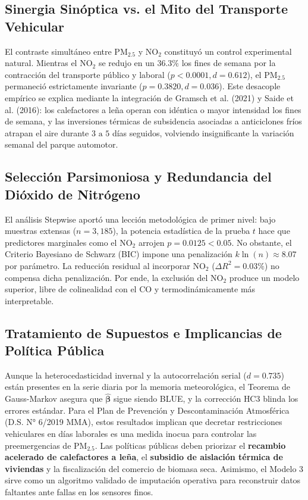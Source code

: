 \documentclass[10pt,twocolumn,a4paper]{article}
\begin{document}
\subsection{Sinergia Sinóptica vs. el Mito del Transporte Vehicular}
El contraste simultáneo entre $\text{PM}_{2.5}$ y $\text{NO}_2$ constituyó un control experimental natural. Mientras el $\text{NO}_2$ se redujo en un $36.3\%$ los fines de semana por la contracción del transporte público y laboral ($p < 0.0001, d = 0.612$), el $\text{PM}_{2.5}$ permaneció estrictamente invariante ($p = 0.3820, d = 0.036$). Este desacople empírico se explica mediante la integración de Gramsch et al. (2021) y Saide et al. (2016): los calefactores a leña operan con idéntica o mayor intensidad los fines de semana, y las inversiones térmicas de subsidencia asociadas a anticiclones fríos atrapan el aire durante $3\text{ a }5$ días seguidos, volviendo insignificante la variación semanal del parque automotor.

\subsection{Selección Parsimoniosa y Redundancia del Dióxido de Nitrógeno}
El análisis Stepwise aportó una lección metodológica de primer nivel: bajo muestras extensas ($n = 3,185$), la potencia estadística de la prueba $t$ hace que predictores marginales como el $\text{NO}_2$ arrojen $p = 0.0125 < 0.05$. No obstante, el Criterio Bayesiano de Schwarz (BIC) impone una penalización $k \ln(n) \approx 8.07$ por parámetro. La reducción residual al incorporar $\text{NO}_2$ ($\Delta R^2 = 0.03\%$) no compensa dicha penalización. Por ende, la exclusión del $\text{NO}_2$ produce un modelo superior, libre de colinealidad con el $\text{CO}$ y termodinámicamente más interpretable.

\subsection{Tratamiento de Supuestos e Implicancias de Política Pública}
Aunque la heterocedasticidad invernal y la autocorrelación serial ($d = 0.735$) están presentes en la serie diaria por la memoria meteorológica, el Teorema de Gauss-Markov asegura que $\hat{\boldsymbol{\beta}}$ sigue siendo BLUE, y la corrección $\text{HC3}$ blinda los errores estándar. Para el Plan de Prevención y Descontaminación Atmosférica (D.S. N° 6/2019 MMA), estos resultados implican que decretar restricciones vehiculares en días laborales es una medida inocua para controlar las preemergencias de $\text{PM}_{2.5}$. Las políticas públicas deben priorizar el \textbf{recambio acelerado de calefactores a leña}, el \textbf{subsidio de aislación térmica de viviendas} y la fiscalización del comercio de biomasa seca. Asimismo, el Modelo 3 sirve como un algoritmo validado de imputación operativa para reconstruir datos faltantes ante fallas en los sensores finos.
\end{document}
